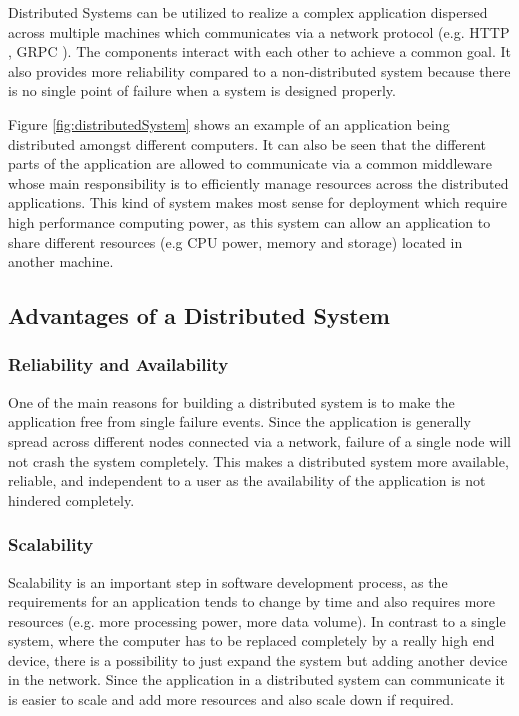     \par
    Distributed Systems can be utilized to realize a complex application dispersed across
    multiple machines which communicates via a network protocol (e.g. HTTP \cite{HTTP}, 
    GRPC \cite{grpc}). The 
    components interact with each other to achieve a common goal. It also provides
    more reliability compared to a non-distributed system because there is no single point
    of failure when a system is designed properly. 

    \par
    Figure \ref{fig:distributedSystem} shows an example of an application being 
    distributed amongst different computers. It can also be seen that the different parts of the application are allowed
    to communicate via a common middleware whose main responsibility is to
    efficiently manage resources across the distributed applications. This kind of system
    makes most sense for deployment which require high performance computing power, as this system can allow an application to share different
    resources (e.g CPU power, memory and storage) located in another machine.



    
        
    \subsection{Advantages of a Distributed System} 
        \subsubsection{Reliability and Availability}
        One of the main reasons for building a distributed system is to make the application free from single failure events.
        Since the application is generally spread across different nodes connected via a network, failure of a single node will not 
        crash the system completely. This makes a distributed system more available, reliable, and independent to a user as the availability
        of the application is not hindered completely.
        
        \subsubsection{Scalability}
        Scalability is an important step in software development process, as the requirements for an application tends to change by time and also requires more resources
        (e.g. more processing power, more data volume). 
        In contrast to a single system, where the computer 
        has to be replaced completely by a really high end device, there is a possibility to just expand the system but adding another device in the network.
        Since the application in a distributed system can communicate it is easier to scale and add more resources and 
        also scale down if required. 
    
